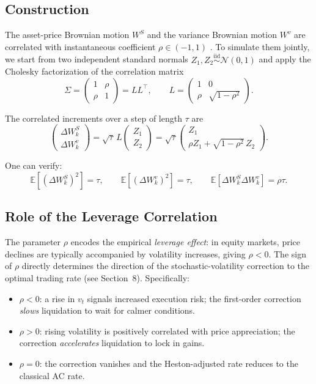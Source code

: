 \documentclass[11pt]{article}
\begin{document}
\subsection{Construction}

The asset-price Brownian motion $W^S$ and the variance Brownian motion $W^v$ are correlated with instantaneous coefficient $\rho \in (-1, 1)$ \cite{black1976studies}. To simulate them jointly, we start from two independent standard normals $Z_1, Z_2 \overset{\text{iid}}{\sim} \mathcal{N}(0,1)$ and apply the Cholesky factorization of the correlation matrix
\[
\Sigma
=
\begin{pmatrix}
1 & \rho \\
\rho & 1
\end{pmatrix}
= LL^\top,
\qquad
L
=
\begin{pmatrix}
1 & 0 \\
\rho & \sqrt{1-\rho^2}
\end{pmatrix}.
\]

The correlated increments over a step of length $\tau$ are
\[
\begin{pmatrix}
\Delta W_k^S \\
\Delta W_k^v
\end{pmatrix}
=
\sqrt{\tau}\,L
\begin{pmatrix}
Z_1 \\
Z_2
\end{pmatrix}
=
\sqrt{\tau}
\begin{pmatrix}
Z_1 \\
\rho Z_1 + \sqrt{1-\rho^2}\,Z_2
\end{pmatrix}.
\]

One can verify:
\[
\mathbb{E}[(\Delta W_k^S)^2] = \tau,
\qquad
\mathbb{E}[(\Delta W_k^v)^2] = \tau,
\qquad
\mathbb{E}[\Delta W_k^S \Delta W_k^v] = \rho\tau.
\]

\subsection{Role of the Leverage Correlation}

The parameter $\rho$ encodes the empirical \emph{leverage effect}: in equity markets, price declines are typically accompanied by volatility increases, giving $\rho < 0$. The sign of $\rho$ directly determines the direction of the stochastic-volatility correction to the optimal trading rate (see Section~8). Specifically:
\begin{itemize}
\item $\rho < 0$: a rise in $v_t$ signals increased execution risk; the first-order correction \emph{slows} liquidation to wait for calmer conditions.
\item $\rho > 0$: rising volatility is positively correlated with price appreciation; the correction \emph{accelerates} liquidation to lock in gains.
\item $\rho = 0$: the correction vanishes and the Heston-adjusted rate reduces to the classical AC rate.
\end{itemize}
\end{document}
